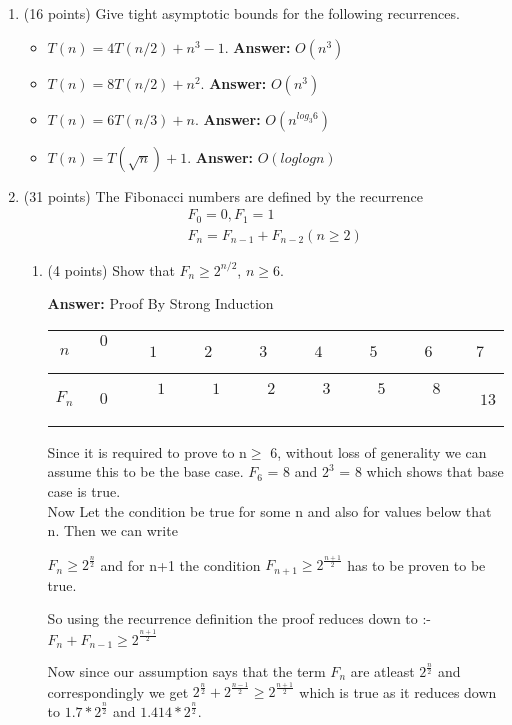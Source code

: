 \documentclass[11pt]{article}
\newcommand{\ans}{\textbf{Answer: }}
\begin{document}
\begin{enumerate}
\item (16 points) Give tight asymptotic bounds for the following recurrences.
\begin{itemize}
\item $T(n) = 4T(n/2)  + n^3 -1$.
\ans $O(n^3)$
\item $T(n) = 8T(n/2) + n^2$.
\ans $O(n^3)$
\item $T(n) = 6T(n/3) + n$.
\ans $O(n^{log_3 6})$
\item  $T(n) = T(\sqrt{n})  + 1$.
\ans $O(loglogn)$
\end{itemize}

\bigskip


\item (31 points) The Fibonacci numbers are defined by the recurrence 
\begin{eqnarray}
&& F_0 =  0, F_1=1 \nonumber \\
&& F_n =  F_{n-1} + F_{n-2}  (n \geq 2) \nonumber 
\end{eqnarray}
\begin{enumerate}
\item (4 points) Show that $F_n \geq 2^{n/2}$, $n \geq 6$. 

\ans Proof By Strong Induction
\begin{table}[tbh]  
\begin{center}
\begin{tabular}{|c|c|c|c|c|c|c|c|c|}\hline  %
$n$ & $0$ \ \ & $1$& $2$& $3$& $4$& $5$& $6$& $7$\\ \hline
$F_n$ & $0$ & \ \ $1$ \ \  & \ \  $1$ \ \   &  \ \ $2$ \ \  &  \ \ $3$ \ \ & \ \ $5$  \ \ &\ \ $8$ \ \ &\ \ $13$\\ \hline
\end{tabular}
\end{center}
\end{table} 
\newpage
Since it is required to prove to n$\geq$ 6, without loss of generality we can assume this to be the base case.
$F_6$ = 8 and $2^3$ = 8 which shows that base case is true.\\
Now Let the condition be true for some n and also for values below that n.
Then we can write 

$F_n \geq 2^\frac{n}{2}$  and for n+1 the condition $F_{n+1} \geq 2^\frac{n+1}{2}$ has to be proven to be true.

So using the recurrence definition the proof reduces down to :-
$F_n + F_{n-1} \geq 2^\frac{n+1}{2}$

Now since our assumption says that the term $F_n$ are atleast $2^\frac{n}{2}$ and correspondingly we get $2^\frac{n}{2}+ 2^\frac{n-1}{2} \geq 2^\frac{n+1}{2}$ which is true as it reduces down to $1.7*2^\frac{n}{2}$ and $1.414*2^\frac{n}{2}$.





\end{enumerate}
\end{enumerate}
\end{document}
